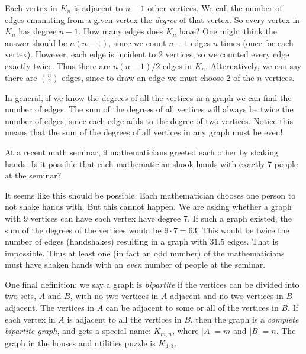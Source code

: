 \documentclass[12pt]{article}
\begin{document}
Each vertex in $K_n$ is adjacent to $n-1$ other vertices.  We call the number of edges emanating from a given vertex the {\em degree} of that vertex.  So every vertex in $K_n$ has degree $n-1$.  How many edges does $K_n$ have?  One might think the answer should be $n(n-1)$, since we count $n-1$ edges $n$ times (once for each vertex).  However, each edge is incident to 2 vertices, so we counted every edge exactly twice.  Thus there are $n(n-1)/2$ edges in $K_n$.  
Alternatively, we can say there are ${n \choose 2}$ edges, since to draw an edge we must choose 2 of the $n$ vertices.

In general, if we know the degrees of all the vertices in a graph we can find the number of edges.  The sum of the degrees of all vertices will always be \underline{twice} the number of edges, since each edge adds to the degree of two vertices.  Notice this means that the sum of the degrees of all vertices in any graph must be even!

\begin{example}
  At a recent math seminar, 9 mathematicians greeted each other by shaking hands.  Is it possible that each mathematician shook hands with exactly 7 people at the seminar?
  \begin{solution}
    It seems like this should be possible.  Each mathematician chooses one person to not shake hands with.  But this cannot happen.  We are asking whether a graph with 9 vertices can have each vertex have degree 7.  If such a graph existed, the sum of the degrees of the vertices would be $9\cdot 7 = 63$.  This would be twice the number of edges (handshakes) resulting in a graph with $31.5$ edges.  That is impossible.  Thus at least one (in fact an odd number) of the mathematicians must have shaken hands with an {\em even} number of people at the seminar.
  \end{solution}

\end{example}

One final definition: we say a graph is {\em bipartite} if the vertices can be divided into two sets, $A$ and $B$, with no two vertices in $A$ adjacent and no two vertices in $B$ adjacent.  The vertices in $A$ can be adjacent to some or all of the vertices in $B$.  If each vertex in $A$ is adjacent to all the vertices in $B$, then the graph is a {\em complete bipartite graph}, and gets a special name: $K_{m,n}$, where $|A| = m$ and $|B| = n$.  The graph in the houses and utilities puzzle is $K_{3,3}$.
\end{document}
